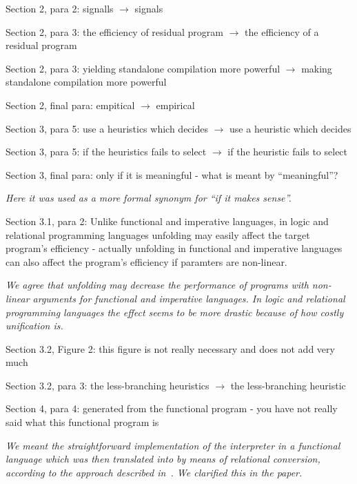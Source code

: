 Section 2, para 2: signalls $\to$ signals

Section 2, para 3: the efficiency of residual program $\to$ the efficiency of a residual program

Section 2, para 3: yielding standalone compilation more powerful $\to$ making standalone compilation more powerful

Section 2, final para: empitical $\to$ empirical

Section 3, para 5: use a heuristics which decides $\to$  use a heuristic which decides

Section 3, para 5: if the heuristics fails to select $\to$ if the heuristic fails to select



Section 3, final para: only if it is meaningful - what is meant by ``meaningful''?

\emph{Here it was used as a more formal synonym for ``if it makes sense''.}

Section 3.1, para 2: Unlike functional and imperative languages, in logic and relational programming languages unfolding
may easily affect the target program’s efficiency - actually unfolding in functional and imperative languages can also
affect the program's efficiency if paramters are non-linear.

\emph{We agree that unfolding may decrease the performance of programs with non-linear arguments for functional and imperative languages. In logic and relational programming languages the effect seems to be more drastic because of how costly unification is. }


Section 3.2, Figure 2: this figure is not really necessary and does not add very much

Section 3.2, para 3: the less-branching heuristics $\to$ the less-branching heuristic

Section 4, para 4: generated from the functional program - you have not really said what this functional program is

\emph{We meant the straightforward implementation of the interpreter in a functional language which was then translated into \mk by means of relational conversion, according to the approach described in~\cite{lozov2019relational}. We clarified this in the paper.}

